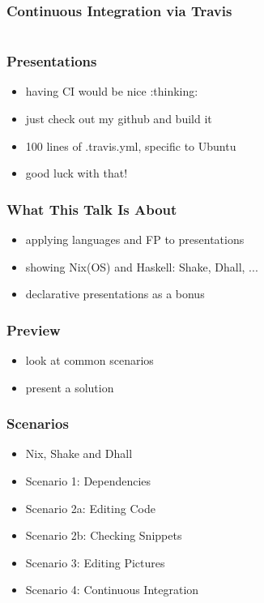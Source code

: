 \documentclass{beamer}
\begin{document}
\begin{frame}
  \frametitle{Continuous Integration via Travis}
  \inputminted[linenos=false, fontsize=\tiny, firstline=91, lastline=120]{yaml}{static-source/long-travis-ci.yml}
\end{frame}

\begin{frame}
  \frametitle{Presentations}
  \begin{itemize}
  \item having CI would be nice :thinking:
  \item just check out my github and build it
  \item 100 lines of .travis.yml, specific to Ubuntu
  \item good luck with that!
  \end{itemize}
\end{frame}

\begin{frame}
  \frametitle{What This Talk Is About}
  \begin{itemize}
  \item applying languages and FP to presentations
  \item showing Nix(OS) and Haskell: Shake, Dhall, ...
  \item declarative presentations as a bonus
  \end{itemize}
\end{frame}

\begin{frame}
  \frametitle{Preview}
  \begin{itemize}
  \item look at common scenarios
  \item present a solution
  \end{itemize}
\end{frame}

\begin{frame}
  \frametitle{Scenarios}
  \begin{itemize}
  \item Nix, Shake and Dhall
  \item Scenario 1: Dependencies
  \item Scenario 2a: Editing Code
  \item Scenario 2b: Checking Snippets
  \item Scenario 3: Editing Pictures
  \item Scenario 4: Continuous Integration
  \end{itemize}
\end{frame}
\end{document}
